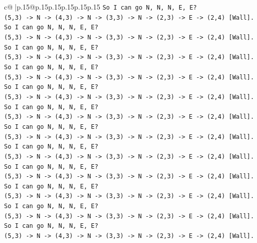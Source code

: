 \documentclass{article}
\begin{document}
{\begin{supertabular}{c@{$\;$}|p{.15\linewidth}@{}p{.15\linewidth}p{.15\linewidth}p{.15\linewidth}p{.15\linewidth}p{.15\linewidth}}
{{{\texttt{So I can go N, N, N, E, E?} \\
\texttt{(5,3) {-}> N {-}> (4,3) {-}> N {-}> (3,3) {-}> N {-}> (2,3) {-}> E {-}> (2,4) {[}Wall{]}.} \\
\texttt{So I can go N, N, N, E, E?} \\
\texttt{(5,3) {-}> N {-}> (4,3) {-}> N {-}> (3,3) {-}> N {-}> (2,3) {-}> E {-}> (2,4) {[}Wall{]}.} \\
\texttt{So I can go N, N, N, E, E?} \\
\texttt{(5,3) {-}> N {-}> (4,3) {-}> N {-}> (3,3) {-}> N {-}> (2,3) {-}> E {-}> (2,4) {[}Wall{]}.} \\
\texttt{So I can go N, N, N, E, E?} \\
\texttt{(5,3) {-}> N {-}> (4,3) {-}> N {-}> (3,3) {-}> N {-}> (2,3) {-}> E {-}> (2,4) {[}Wall{]}.} \\
\texttt{So I can go N, N, N, E, E?} \\
\texttt{(5,3) {-}> N {-}> (4,3) {-}> N {-}> (3,3) {-}> N {-}> (2,3) {-}> E {-}> (2,4) {[}Wall{]}.} \\
\texttt{So I can go N, N, N, E, E?} \\
\texttt{(5,3) {-}> N {-}> (4,3) {-}> N {-}> (3,3) {-}> N {-}> (2,3) {-}> E {-}> (2,4) {[}Wall{]}.} \\
\texttt{So I can go N, N, N, E, E?} \\
\texttt{(5,3) {-}> N {-}> (4,3) {-}> N {-}> (3,3) {-}> N {-}> (2,3) {-}> E {-}> (2,4) {[}Wall{]}.} \\
\texttt{So I can go N, N, N, E, E?} \\
\texttt{(5,3) {-}> N {-}> (4,3) {-}> N {-}> (3,3) {-}> N {-}> (2,3) {-}> E {-}> (2,4) {[}Wall{]}.} \\
\texttt{So I can go N, N, N, E, E?} \\
\texttt{(5,3) {-}> N {-}> (4,3) {-}> N {-}> (3,3) {-}> N {-}> (2,3) {-}> E {-}> (2,4) {[}Wall{]}.} \\
\texttt{So I can go N, N, N, E, E?} \\
\texttt{(5,3) {-}> N {-}> (4,3) {-}> N {-}> (3,3) {-}> N {-}> (2,3) {-}> E {-}> (2,4) {[}Wall{]}.} \\
\texttt{So I can go N, N, N, E, E?} \\
\texttt{(5,3) {-}> N {-}> (4,3) {-}> N {-}> (3,3) {-}> N {-}> (2,3) {-}> E {-}> (2,4) {[}Wall{]}.} \\
\texttt{So I can go N, N, N, E, E?} \\
\texttt{(5,3) {-}> N {-}> (4,3) {-}> N {-}> (3,3) {-}> N {-}> (2,3) {-}> E {-}> (2,4) {[}Wall{]}.} \\
}}}
\end{supertabular}}
\end{document}
